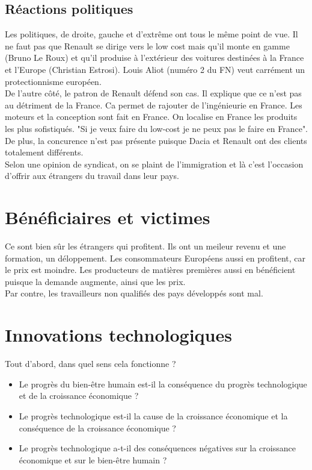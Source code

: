 \subsection{Réactions politiques}
Les politiques, de droite, gauche et d'extrême ont tous le même point de vue. Il ne faut pas que Renault se dirige vers le low cost mais qu'il monte en gamme (Bruno Le Roux) et qu'il produise à l'extérieur des voitures destinées à la France et l'Europe (Christian Estrosi). Louis Aliot (numéro 2 du FN) veut carrément un protectionnisme européen. \\
De l'autre côté, le patron de Renault défend son cas. Il explique que ce n'est pas au détriment de la France. Ca permet de rajouter de l'ingénieurie en France. Les moteurs et la conception sont fait en France. On localise en France les produits les plus sofistiqués. "Si je veux faire du low-cost je ne peux pas le faire en France". De plus, la concurence n'est pas présente puisque Dacia et Renault ont des clients totalement différents. \\
Selon une opinion de syndicat, on se plaint de l'immigration et là c'est l'occasion d'offrir aux étrangers du travail dans leur pays. 

\section{Bénéficiaires et victimes}
Ce sont bien sûr les étrangers qui profitent. Ils ont un meileur revenu et une formation, un déloppement. Les consommateurs Européens aussi en profitent, car le prix est moindre. Les producteurs de matières premières aussi en bénéficient puisque la demande augmente, ainsi que les prix. \\
Par contre, les travailleurs non qualifiés des pays développés sont mal. 

\section{Innovations technologiques}
Tout d'abord, dans quel sens cela fonctionne ? 

\begin{itemize}
	\item Le progrès du bien-être humain est-il la conséquence du progrès technologique et de la croissance économique ? 
	
	\item Le progrès technologique est-il la cause de la croissance économique et la conséquence de la croissance économique ? 
	
	\item Le progrès technologique a-t-il des conséquences négatives sur la croissance économique et sur le bien-être humain ?
\end{itemize}

